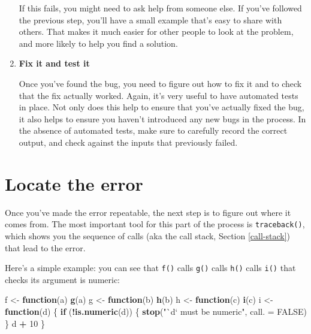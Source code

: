 \documentclass[]{book}
\makeatletter
\newenvironment{Shaded}{\begin{snugshade}}{\end{snugshade}}
\newcommand{\ControlFlowTok}[1]{\textcolor[rgb]{0.27,0.27,0.27}{\textbf{#1}}}
\newcommand{\DataTypeTok}[1]{\textcolor[rgb]{0.27,0.27,0.27}{#1}}
\newcommand{\DecValTok}[1]{\textcolor[rgb]{0.06,0.06,0.06}{#1}}
\newcommand{\KeywordTok}[1]{\textcolor[rgb]{0.27,0.27,0.27}{\textbf{#1}}}
\newcommand{\NormalTok}[1]{#1}
\newcommand{\OperatorTok}[1]{\textcolor[rgb]{0.43,0.43,0.43}{\textbf{#1}}}
\newcommand{\OtherTok}[1]{\textcolor[rgb]{0.37,0.37,0.37}{#1}}
\newcommand{\StringTok}[1]{\textcolor[rgb]{0.5,0.5,0.5}{#1}}
\newcommand{\indexc}[1]{\index{#1@\texttt{#1}}}
\makeatother
\begin{document}
\begin{enumerate}
  If this fails, you might need to ask help from someone else. If you've
  followed the previous step, you'll have a small example that's easy to
  share with others. That makes it much easier for other people to look at
  the problem, and more likely to help you find a solution.
\item
  \textbf{Fix it and test it}

  Once you've found the bug, you need to figure out how to fix it and to check
  that the fix actually worked. Again, it's very useful to have automated
  tests in place. Not only does this help to ensure that you've actually fixed
  the bug, it also helps to ensure you haven't introduced any new bugs in the
  process. In the absence of automated tests, make sure to carefully record
  the correct output, and check against the inputs that previously failed.
\end{enumerate}

\hypertarget{traceback}{%
\section{Locate the error}\label{traceback}}

\indexc{traceback()}

Once you've made the error repeatable, the next step is to figure out where it comes from. The most important tool for this part of the process is \texttt{traceback()}, which shows you the sequence of calls (aka the call stack, Section \ref{call-stack}) that lead to the error.

Here's a simple example: you can see that \texttt{f()} calls \texttt{g()} calls \texttt{h()} calls \texttt{i()} that checks its argument is numeric:

\begin{Shaded}
\begin{Highlighting}[]
\NormalTok{f <-}\StringTok{ }\ControlFlowTok{function}\NormalTok{(a) }\KeywordTok{g}\NormalTok{(a)}
\NormalTok{g <-}\StringTok{ }\ControlFlowTok{function}\NormalTok{(b) }\KeywordTok{h}\NormalTok{(b)}
\NormalTok{h <-}\StringTok{ }\ControlFlowTok{function}\NormalTok{(c) }\KeywordTok{i}\NormalTok{(c)}
\NormalTok{i <-}\StringTok{ }\ControlFlowTok{function}\NormalTok{(d) \{}
  \ControlFlowTok{if}\NormalTok{ (}\OperatorTok{!}\KeywordTok{is.numeric}\NormalTok{(d)) \{}
    \KeywordTok{stop}\NormalTok{(}\StringTok{"`d` must be numeric"}\NormalTok{, }\DataTypeTok{call. =} \OtherTok{FALSE}\NormalTok{)}
\NormalTok{  \}}
\NormalTok{  d }\OperatorTok{+}\StringTok{ }\DecValTok{10}
\NormalTok{\}}
\end{Highlighting}
\end{Shaded}
\end{document}
